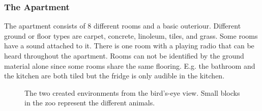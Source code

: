 \documentclass{sig-alternate}
\begin{document}
\subsubsection{The Apartment}

The apartment consists of 8 different rooms and a basic outeriour. Different
ground or floor types are carpet, concrete, linoleum, tiles, and grass.
Some rooms have a sound attached to it. There is one room with a playing radio that can be heard
throughout the apartment. Rooms can not be identified by the ground material
alone since some rooms share the same flooring. E.g. the bathroom and the
kitchen are both tiled but the fridge is only audible in the kitchen.

\begin{figure}[tb]
  \centering
  \caption{The two created environments from the bird's-eye view. Small blocks
  in the zoo represent the different animals.}
  \label{fig:levels}
\end{figure}
\end{document}
